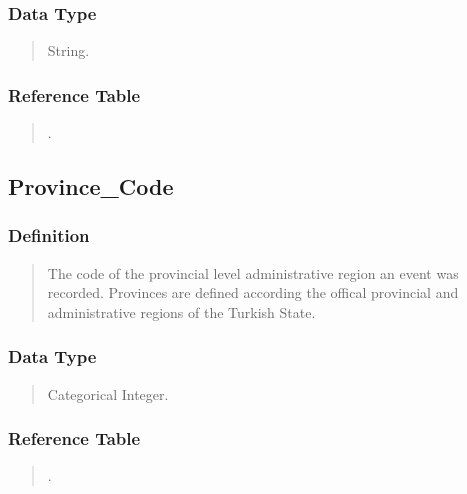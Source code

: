 \documentclass[letterpaper,10pt,english]{sphinxmanual}
\begin{document}
\subsubsection{Data Type}
\label{\detokenize{database_schema:id32}}\begin{quote}

\sphinxAtStartPar
String.
\end{quote}


\subsubsection{Reference Table}
\label{\detokenize{database_schema:id33}}\begin{quote}

\sphinxAtStartPar
{\hyperref[\detokenize{database_schema:province-table}]{}}.
\end{quote}


\subsection{Province\_Code}
\label{\detokenize{database_schema:province-code}}

\subsubsection{Definition}
\label{\detokenize{database_schema:id34}}\begin{quote}

\sphinxAtStartPar
The code of the provincial level administrative region an event was recorded.  Provinces are defined according the offical provincial and administrative regions of the Turkish State.
\end{quote}


\subsubsection{Data Type}
\label{\detokenize{database_schema:id35}}\begin{quote}

\sphinxAtStartPar
Categorical Integer.
\end{quote}


\subsubsection{Reference Table}
\label{\detokenize{database_schema:id36}}\begin{quote}

\sphinxAtStartPar
{\hyperref[\detokenize{database_schema:province-table}]{}}.
\end{quote}
\end{document}
